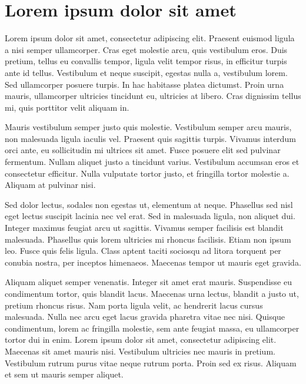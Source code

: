\documentclass[a4paper,11pt]{report}
\begin{document}
    \chapter*{Lorem ipsum dolor sit amet}
    Lorem ipsum dolor sit amet, consectetur adipiscing elit. Praesent euismod ligula a nisi semper
    ullamcorper. Cras eget molestie arcu, quis vestibulum eros. Duis pretium, tellus eu convallis tempor,
    ligula velit tempor risus, in efficitur turpis ante id tellus. Vestibulum et neque suscipit, egestas
    nulla a, vestibulum lorem. Sed ullamcorper posuere turpis. In hac habitasse platea dictumst. Proin urna
    mauris, ullamcorper ultricies tincidunt eu, ultricies at libero. Cras dignissim tellus mi, quis
    porttitor velit aliquam in.

    Mauris vestibulum semper justo quis molestie. Vestibulum semper arcu mauris, non malesuada ligula
    iaculis vel. Praesent quis sagittis turpis. Vivamus interdum orci ante, eu sollicitudin mi ultrices sit
    amet. Fusce posuere elit sed pulvinar fermentum. Nullam aliquet justo a tincidunt varius. Vestibulum
    accumsan eros et consectetur efficitur. Nulla vulputate tortor justo, et fringilla tortor molestie a.
    Aliquam at pulvinar nisi.

    Sed dolor lectus, sodales non egestas ut, elementum at neque. Phasellus sed nisl eget lectus suscipit
    lacinia nec vel erat. Sed in malesuada ligula, non aliquet dui. Integer maximus feugiat arcu ut
    sagittis. Vivamus semper facilisis est blandit malesuada. Phasellus quis lorem ultricies mi rhoncus
    facilisis. Etiam non ipsum leo. Fusce quis felis ligula. Class aptent taciti sociosqu ad litora
    torquent per conubia nostra, per inceptos himenaeos. Maecenas tempor ut mauris eget gravida.

    Aliquam aliquet semper venenatis. Integer sit amet erat mauris. Suspendisse eu condimentum tortor, quis
    blandit lacus. Maecenas urna lectus, blandit a justo ut, pretium rhoncus risus. Nam porta ligula velit,
    ac hendrerit lacus cursus malesuada. Nulla nec arcu eget lacus gravida pharetra vitae nec nisi. Quisque
    condimentum, lorem ac fringilla molestie, sem ante feugiat massa, eu ullamcorper tortor dui in enim.
    Lorem ipsum dolor sit amet, consectetur adipiscing elit. Maecenas sit amet mauris nisi. Vestibulum
    ultricies nec mauris in pretium. Vestibulum rutrum purus vitae neque rutrum porta. Proin sed ex risus.
    Aliquam et sem ut mauris semper aliquet.
\end{document}
